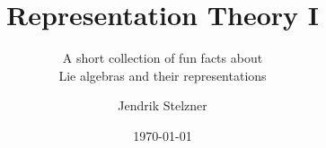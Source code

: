 \documentclass[a4paper,10pt,twoside=semi,openany]{scrbook}
\title{Representation Theory I}
\subtitle{A short collection of fun facts about \\ Lie algebras and their representations}
\author{Jendrik Stelzner}
\date{\today}
\begin{document}
\frontmatter
\maketitle

\tableofcontents

\mainmatter



\appendix
\addappheadtotoc
\appendixpage


\backmatter


\end{document}
